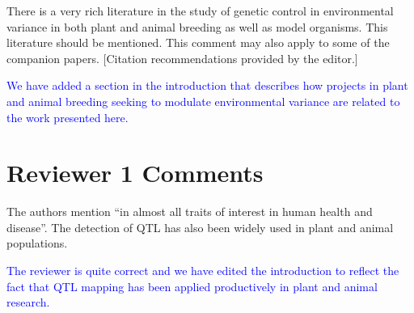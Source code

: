 \documentclass[11pt]{article}
\newcommand{\ReviewerQuestion}[1]{
  \vspace{5pt}\goodbreak
  \noindent\fbox{Reviewer:} #1
  \normalfont\par
}
\newcommand{\EditorQuestion}[1]{
  \vspace{5pt}\goodbreak
  \noindent\fbox{Editor:} #1
  \normalfont\par
}
\newcommand{\Response}[1]{
  \goodbreak
  \textcolor{blue}{#1}
  \normalfont\par
}
\begin{document}
\EditorQuestion{
  There is a very rich literature in the study of genetic control in environmental variance in both plant and animal breeding as well as model organisms.
  This literature should be mentioned. This comment may also apply to some of the companion papers.
  [Citation recommendations provided by the editor.]
}
\Response{
  We have added a section in the introduction that describes how projects in plant and animal breeding seeking to modulate environmental variance are related to the work presented here.
}







\section*{Reviewer 1 Comments}

\ReviewerQuestion{
  The authors mention ``in almost all traits of interest in human health and disease''.
  The detection of QTL has also been widely used in plant and animal populations.
}
\Response{
  The reviewer is quite correct and we have edited the introduction to reflect the fact that QTL mapping has been applied productively in plant and animal research.
}
\end{document}
